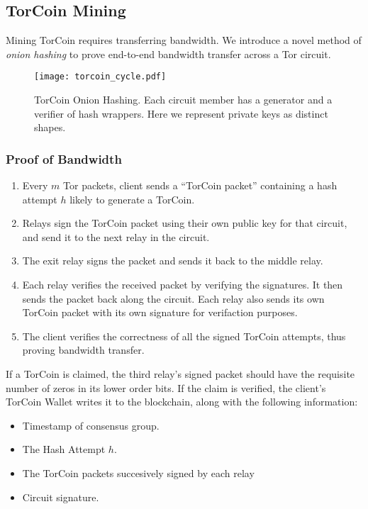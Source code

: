 \subsection{TorCoin Mining}

Mining TorCoin requires transferring bandwidth. We introduce a novel method of
\textit{onion hashing} to prove end-to-end bandwidth transfer across a Tor
circuit.

\begin{figure}[H]
  \centering
    \texttt{[image: torcoin\_cycle.pdf]}
  \caption{TorCoin Onion Hashing. Each circuit member has a generator and a 
  verifier of hash wrappers. Here we represent private keys as distinct shapes.}
\end{figure}

\subsubsection{Proof of Bandwidth}
\begin{enumerate}
\item Every $m$ Tor packets, client sends a ``TorCoin packet'' containing a hash
attempt $h$ likely to generate a TorCoin.
\item Relays sign the TorCoin packet using their own public key for that circuit, 
and send it to the next relay in the circuit.
\item The exit relay signs the packet and sends it back to the middle relay.
\item Each relay verifies the received packet by verifying the signatures. It 
then sends the packet back along the circuit. Each relay also sends its own 
TorCoin packet with its own signature for verifaction purposes.
\item The client verifies the correctness of all the signed TorCoin attempts, 
thus proving
bandwidth transfer.
\end{enumerate}

If a TorCoin is claimed, the third relay's signed packet should have the
requisite number of zeros in its lower order bits. If the claim is verified,
the client's TorCoin Wallet writes it to the blockchain, along with the
following information:

\begin{itemize}
\item Timestamp of consensus group.
\item The Hash Attempt $h$.
\item The TorCoin packets succesively signed by each relay
\item Circuit signature.
\end{itemize}

